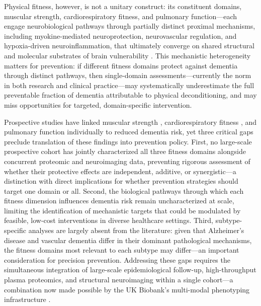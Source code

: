 \documentclass{article}
\begin{document}
Physical fitness, however, is not a unitary construct: its constituent 
domains, muscular strength, cardiorespiratory fitness, and pulmonary 
function—each engage neurobiological pathways through partially distinct proximal 
mechanisms, including myokine-mediated neuroprotection, neurovascular regulation, 
and hypoxia-driven neuroinflammation, that ultimately converge on shared structural 
and molecular substrates of brain vulnerability \citep{wrann2013exercise, 
iadecola2019vascular, wang2022pulmonary}. This mechanistic heterogeneity matters 
for prevention: if different fitness domains protect against dementia through 
distinct pathways, then single-domain assessments—currently the norm in both 
research and clinical practice—may systematically underestimate the full 
preventable fraction of dementia attributable to physical deconditioning, and 
may miss opportunities for targeted, domain-specific intervention.


Prospective studies have linked muscular strength %
\citep{esteban2022handgrip}, 
cardiorespiratory fitness \citep{wang2025association}, and pulmonary function 
\citep{rundek2020global} individually to reduced dementia risk, yet three critical 
gaps preclude translation of these findings into prevention policy. First, no 
large-scale prospective cohort has jointly characterized all three fitness domains 
alongside concurrent proteomic and neuroimaging data, preventing rigorous 
assessment of whether their protective effects are independent, additive, or 
synergistic—a distinction with direct implications for whether prevention 
strategies should target one domain or all. Second, the biological pathways 
through which each fitness dimension influences dementia risk remain 
uncharacterized at scale, limiting the identification of mechanistic targets that 
could be modulated by feasible, low-cost interventions in diverse healthcare 
settings. Third, subtype-specific analyses are largely absent from the literature: 
given that Alzheimer's disease and vascular dementia differ in their dominant 
pathological mechanisms, the fitness domains most relevant to each subtype may 
differ—an important consideration for precision prevention. Addressing these gaps 
requires the simultaneous integration of large-scale epidemiological follow-up, 
high-throughput plasma proteomics, and structural neuroimaging within a single 
cohort—a combination now made possible by the UK Biobank's multi-modal 
phenotyping infrastructure \citep{sudlow2015uk, miller2016multimodal, 
sun2023plasma}.
\end{document}
